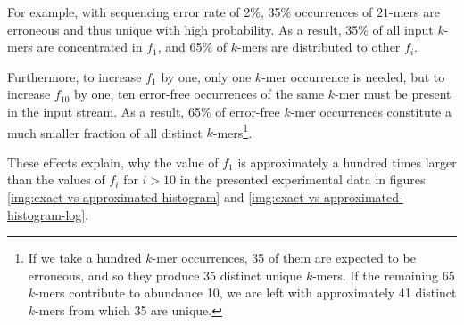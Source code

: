 For example, with sequencing error rate of 2\%, 35\% occurrences of $21$-mers are erroneous and thus
unique with high probability. As a result, 35\% of all input $k$-mers are concentrated in $f_1$, and
65\% of $k$-mers are distributed to other $f_i$. 

Furthermore, to increase $f_1$ by one, only one $k$-mer occurrence is needed, but to increase
$f_{10}$ by one, ten error-free occurrences of the same $k$-mer must be present in the input stream. 
As a result, 65\% of error-free $k$-mer occurrences constitute a much smaller fraction of all 
distinct $k$-mers\footnote{If we take a hundred $k$-mer occurrences, 35 of them are expected
to be erroneous, and so they produce 35 distinct unique $k$-mers. If the remaining 65 $k$-mers 
contribute to abundance 10, we are left with approximately 41 distinct $k$-mers from which 
35 are unique.}.

These effects explain, why the value of $f_1$ is approximately a hundred times larger than
the values of $f_i$ for $i>10$ in the presented experimental data in figures
\ref{img:exact-vs-approximated-histogram} and \ref{img:exact-vs-approximated-histogram-log}.
